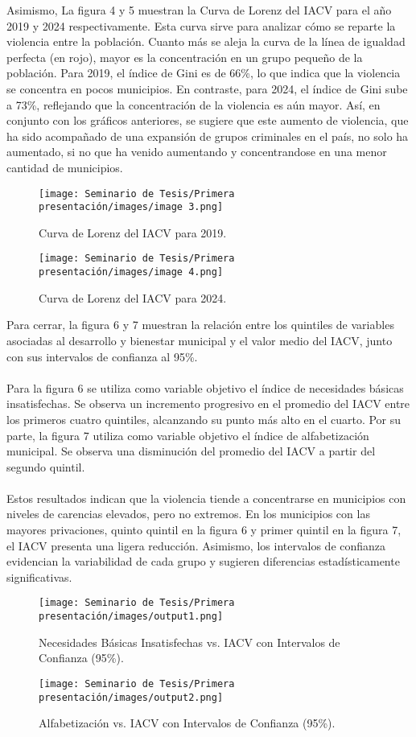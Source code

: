 Asimismo, La figura 4 y 5 muestran la Curva de Lorenz del IACV para el año 2019 y 2024 respectivamente. Esta curva sirve para analizar cómo se reparte la violencia entre la población. Cuanto más se aleja la curva de la línea de igualdad perfecta (en rojo), mayor es la concentración en un grupo pequeño de la población. Para 2019, el índice de Gini es de 66\%, lo que indica que la violencia se concentra en pocos municipios. En contraste, para 2024, el índice de Gini sube a 73\%, reflejando que la concentración de la violencia es aún mayor. Así, en conjunto con los gráficos anteriores, se sugiere que este aumento de violencia, que ha sido acompañado de una expansión de grupos criminales en el país, no solo ha aumentado, si no que ha venido aumentando y concentrandose en una menor cantidad de municipios.
\newpage
\begin{figure}[h]
    \centering
    \texttt{[image: Seminario de Tesis/Primera presentación/images/image 3.png]}
    \caption{Curva de Lorenz del IACV para 2019.}
    \label{fig:graph4}
\end{figure}

\begin{figure}[h]
    \centering
    \texttt{[image: Seminario de Tesis/Primera presentación/images/image 4.png]}
    \caption{Curva de Lorenz del IACV para 2024.}
    \label{fig:graph5}
\end{figure}
\newpage
Para cerrar, la figura 6 y 7 muestran la relación entre los quintiles de variables asociadas al desarrollo y bienestar municipal y el valor medio del IACV, junto con sus intervalos de confianza al 95\%. 
\\\\
Para la figura 6 se utiliza como variable objetivo el índice de necesidades básicas insatisfechas. Se observa un incremento progresivo en el promedio del IACV entre los primeros cuatro quintiles, alcanzando su punto más alto en el cuarto. Por su parte, la figura 7 utiliza como variable objetivo el índice de alfabetización municipal. Se observa una disminución del promedio del IACV a partir del segundo quintil.
\\\\
Estos resultados indican que la violencia tiende a concentrarse en municipios con niveles de carencias elevados, pero no extremos. En los municipios con las mayores privaciones, quinto quintil en la figura 6 y primer quintil en la figura 7, el IACV presenta una ligera reducción. Asimismo, los intervalos de confianza evidencian la variabilidad de cada grupo y sugieren diferencias estadísticamente significativas.
\newpage
\begin{figure}[h]
    \centering
    \texttt{[image: Seminario de Tesis/Primera presentación/images/output1.png]}
    \caption{Necesidades Básicas Insatisfechas vs. IACV con Intervalos de Confianza (95\%).}
    \label{fig:nbivia1}
\end{figure}
\begin{figure}[h]
    \centering
    \texttt{[image: Seminario de Tesis/Primera presentación/images/output2.png]}
    \caption{Alfabetización vs. IACV con Intervalos de Confianza (95\%).}
    \label{fig:nbivia2}
\end{figure}

\newpage